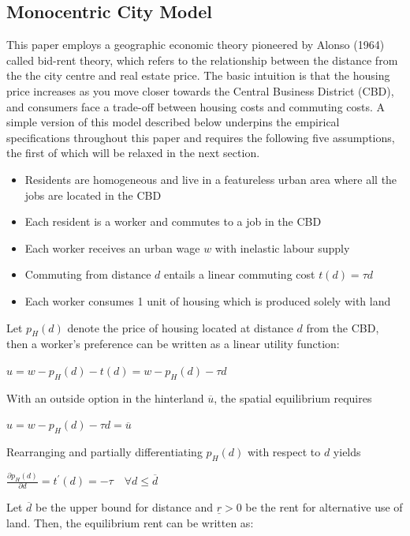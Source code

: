 \documentclass{article}
\begin{document}
\subsection{Monocentric City Model}
This paper employs a geographic economic theory pioneered by Alonso (1964) called bid-rent theory, which refers to the relationship between the distance from the the city centre and real estate price. The basic intuition is that the housing price increases as you move closer towards the Central Business District (CBD), and consumers face a trade-off between housing costs and commuting costs. A simple version of this model described below underpins the empirical specifications throughout this paper and requires the following five assumptions, the first of which will be relaxed in the next section.
\begin{itemize}
\setlength\itemsep{0.1em}
\item Residents are homogeneous and live in a featureless urban area where all the jobs are located in the CBD
\item Each resident is a worker and commutes to a job in the CBD
\item Each worker receives an urban wage $w$ with inelastic labour supply
\item Commuting from distance $d$ entails a linear commuting cost $t(d) = \tau d$
\item Each worker consumes 1 unit of housing which is produced solely  with land
\end{itemize}
Let $p_H (d)$ denote the price of housing located at distance $d$ from the CBD, then a worker's preference can be written as a linear utility function:
\begin{center}
$u = w - p _ { H } ( d ) - t ( d ) = w - p _ { H } ( d ) - \tau d$
\end{center}
With an outside option in the hinterland $\overline{u}$, the spatial equilibrium requires
\begin{center}
$u = w - p _ { H } ( d ) - \tau d = \overline { u }$
\end{center}
Rearranging and partially differentiating $p_H (d)$ with respect to $d$ yields 
\begin{center}
$\frac { \partial p _ { H } ( d ) } { \partial d } = t ^ { \prime } ( d ) = - \tau \quad \forall d \leq \overline { d }$
\end{center}
Let $\overline{d}$ be the upper bound for distance and $\underline{r} > 0$ be the rent for alternative use of land. Then, the equilibrium rent can be written as:
\end{document}
